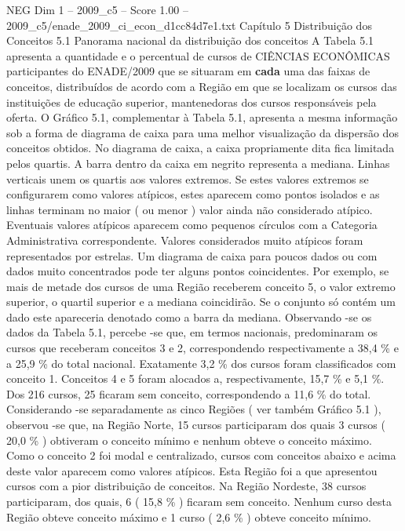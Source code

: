 \begin{textsample}{NEG Dim 1 – 2009\_c5 – Score 1.00 – 2009\_c5/enade\_2009\_ci\_econ\_d1cc84d7e1.txt}  \label{ex:f1_neg_300}
Capítulo 5 Distribuição dos Conceitos 5.1 Panorama nacional da distribuição dos conceitos A Tabela 5.1 apresenta a quantidade e o percentual de cursos de CIÊNCIAS ECONÔMICAS participantes do ENADE/2009 que se situaram em \textbf{cada} uma das faixas de conceitos, distribuídos de acordo com a Região em que se localizam os cursos das instituições de educação superior, mantenedoras dos cursos responsáveis pela oferta.
O Gráfico 5.1, complementar à Tabela 5.1, apresenta a mesma informação sob a forma de diagrama de caixa para uma melhor visualização da dispersão dos conceitos obtidos.
No diagrama de caixa, a caixa propriamente dita fica limitada pelos quartis.
A barra dentro da caixa em negrito representa a mediana.
Linhas verticais unem os quartis aos valores extremos.
Se estes valores extremos se configurarem como valores atípicos, estes aparecem como pontos isolados e as linhas terminam no maior ( ou menor ) valor ainda não considerado atípico.
Eventuais valores atípicos aparecem como pequenos círculos com a Categoria Administrativa correspondente.
Valores considerados muito atípicos foram representados por estrelas.
Um diagrama de caixa para poucos dados ou com dados muito concentrados pode ter alguns pontos coincidentes.
Por exemplo, se mais de metade dos cursos de uma Região receberem conceito 5, o valor extremo superior, o quartil superior e a mediana coincidirão.
Se o conjunto só contém um dado este apareceria denotado como a barra da mediana.
Observando -se os dados da Tabela 5.1, percebe -se que, em termos nacionais, predominaram os cursos que receberam conceitos 3 e 2, correspondendo respectivamente a 38,4 \% e a 25,9 \% do total nacional.
Exatamente 3,2 \% dos cursos foram classificados com conceito 1.
Conceitos 4 e 5 foram alocados a, respectivamente, 15,7 \% e 5,1 \%.
Dos 216 cursos, 25 ficaram sem conceito, correspondendo a 11,6 \% do total.
Considerando -se separadamente as cinco Regiões ( ver também Gráfico 5.1 ), observou -se que, na Região Norte, 15 cursos participaram dos quais 3 cursos ( 20,0 \% ) obtiveram o conceito mínimo e nenhum obteve o conceito máximo.
Como o conceito 2 foi modal e centralizado, cursos com conceitos abaixo e acima deste valor aparecem como valores atípicos.
Esta Região foi a que apresentou cursos com a pior distribuição de conceitos.
Na Região Nordeste, 38 cursos participaram, dos quais, 6 ( 15,8 \% ) ficaram sem conceito.
Nenhum curso desta Região obteve conceito máximo e 1 curso ( 2,6 \% ) obteve conceito mínimo.

\end{textsample}
